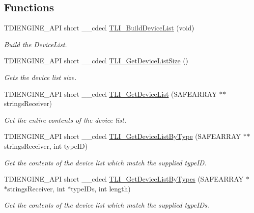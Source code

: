 \subsection*{Functions}
\begin{DoxyCompactItemize}
\item 
T\+D\+I\+E\+N\+G\+I\+N\+E\+\_\+\+A\+PI short \+\_\+\+\_\+cdecl \hyperlink{group___t_d_i_engine_ga52172093bc1f00c7f38a390df8b8023d}{T\+L\+I\+\_\+\+Build\+Device\+List} (void)
\begin{DoxyCompactList}\small\item\em Build the Device\+List. \end{DoxyCompactList}\item 
T\+D\+I\+E\+N\+G\+I\+N\+E\+\_\+\+A\+PI short \+\_\+\+\_\+cdecl \hyperlink{group___t_d_i_engine_ga52c1bdceeef09dd1c53c864def554f34}{T\+L\+I\+\_\+\+Get\+Device\+List\+Size} ()
\begin{DoxyCompactList}\small\item\em Gets the device list size. \end{DoxyCompactList}\item 
T\+D\+I\+E\+N\+G\+I\+N\+E\+\_\+\+A\+PI short \+\_\+\+\_\+cdecl \hyperlink{group___t_d_i_engine_gac45bdf269842c5d2512bf04573d79a33}{T\+L\+I\+\_\+\+Get\+Device\+List} (S\+A\+F\+E\+A\+R\+R\+AY $\ast$$\ast$strings\+Receiver)
\begin{DoxyCompactList}\small\item\em Get the entire contents of the device list. \end{DoxyCompactList}\item 
T\+D\+I\+E\+N\+G\+I\+N\+E\+\_\+\+A\+PI short \+\_\+\+\_\+cdecl \hyperlink{group___t_d_i_engine_ga3fd41c223e581578dafab7ef09890474}{T\+L\+I\+\_\+\+Get\+Device\+List\+By\+Type} (S\+A\+F\+E\+A\+R\+R\+AY $\ast$$\ast$strings\+Receiver, int type\+ID)
\begin{DoxyCompactList}\small\item\em Get the contents of the device list which match the supplied type\+ID. \end{DoxyCompactList}\item 
T\+D\+I\+E\+N\+G\+I\+N\+E\+\_\+\+A\+PI short \+\_\+\+\_\+cdecl \hyperlink{group___t_d_i_engine_gac6c0524f385c4b1cb01f07da915ebf14}{T\+L\+I\+\_\+\+Get\+Device\+List\+By\+Types} (S\+A\+F\+E\+A\+R\+R\+AY $\ast$$\ast$strings\+Receiver, int $\ast$type\+I\+Ds, int length)
\begin{DoxyCompactList}\small\item\em Get the contents of the device list which match the supplied type\+I\+Ds. \end{DoxyCompactList}\item 
$$
\end{DoxyCompactItemize}
